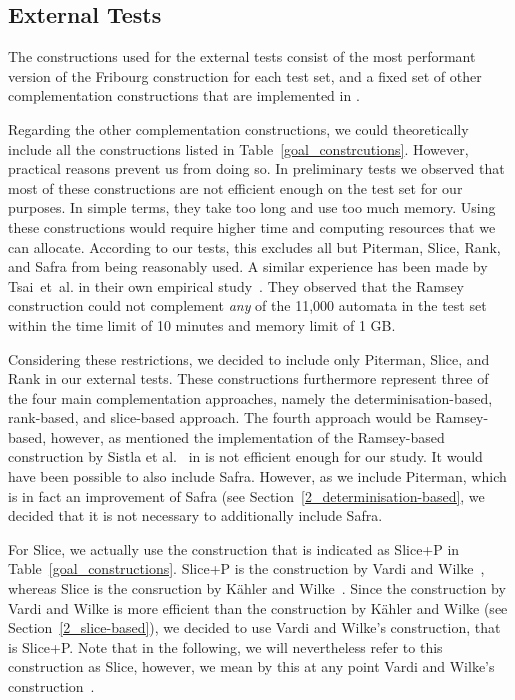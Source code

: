 \subsection{External Tests}
The constructions used for the external tests consist of the most performant version of the Fribourg construction for each test set, and a fixed set of other complementation constructions that are implemented in \goal.

Regarding the other complementation constructions, we could theoretically include all the constructions listed in Table~\ref{goal_constrcutions}. However, practical reasons prevent us from doing so. In preliminary tests we observed that most of these constructions are not efficient enough on the \goal{} test set for our purposes. In simple terms, they take too long and use too much memory. Using these constructions would require higher time and computing resources that we can allocate. According to our tests, this excludes all but  Piterman, Slice, Rank, and Safra from being reasonably used. A similar experience has been made by Tsai~et~al. in their own empirical study~\cite{2011_tsai}. They observed that the Ramsey construction could not complement \textit{any} of the 11,000 automata in the \goal{} test set within the time limit of 10 minutes and memory limit of 1 GB.

Considering these restrictions, we decided to include only Piterman, Slice, and Rank in our external tests. These constructions furthermore represent three of the four main complementation approaches, namely the determinisation-based, rank-based, and slice-based approach. The fourth approach would be Ramsey-based, however, as mentioned the implementation of the Ramsey-based construction by Sistla et al.~\cite{1985_sistla} in \goal{} is not efficient enough for our study. It would have been possible to also include Safra. However, as we include Piterman, which is in fact an improvement of Safra (see Section~\ref{2_determinisation-based}, we decided that it is not necessary to additionally include Safra. 

For Slice, we actually use the construction that is indicated as Slice+P in Table~\ref{goal_constructions}. Slice+P is the construction by Vardi and Wilke~\cite{vardi2007automata}, whereas Slice is the consruction by Kähler and Wilke~\cite{2008_kaehler}. Since the construction by Vardi and Wilke is more efficient than the construction by Kähler and Wilke (see Section~\ref{2_slice-based}), we decided to use Vardi and Wilke's construction, that is Slice+P. Note that in the following, we will nevertheless refer to this construction as Slice, however, we mean by this at any point Vardi and Wilke's construction~\cite{vardi2007automata}.

